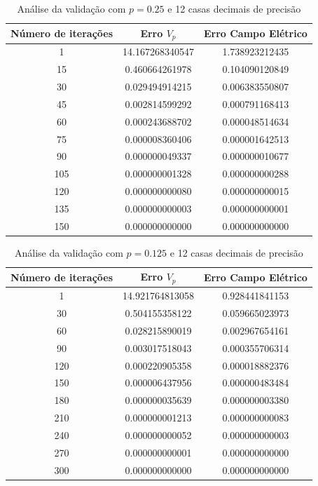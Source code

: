 \documentclass[oneside]{abntex2}
\begin{document}
\begin{table}[h]
    \centering
    \begin{tabular}{c|c|c}
    Número de iterações &Erro $V_p$ &Erro Campo Elétrico  \\
    \hline
    1 & 14.167268340547 & 1.738923212435 \\
    15 & 0.460664261978 & 0.104090120849 \\
    30 & 0.029494914215 & 0.006383550807 \\
    45 & 0.002814599292 & 0.000791168413 \\
    60 & 0.000243688702 & 0.000048514634 \\
    75 & 0.000008360406 & 0.000001642513 \\
    90 & 0.000000049337 & 0.000000010677 \\
    105 & 0.000000001328 & 0.000000000288 \\
    120 & 0.000000000080 & 0.000000000015 \\
    135 & 0.000000000003 & 0.000000000001 \\
    150 & 0.000000000000 & 0.000000000000 \\
    \end{tabular}
    \caption{Análise da validação com $p = 0.25$ e 12 casas decimais de precisão}
    \label{tab:iter_p025}
\end{table}

\begin{table}[h]
    \centering
    \begin{tabular}{c|c|c}
    Número de iterações &Erro $V_p$ &Erro Campo Elétrico  \\
    \hline
    1 & 14.921764813058 & 0.928441841153 \\
    30 & 0.504155358122 & 0.059665023973 \\
    60 & 0.028215890019 & 0.002967654161 \\
    90 & 0.003017518043 & 0.000355706314 \\
    120 & 0.000220905358 & 0.000018882376 \\
    150 & 0.000006437956 & 0.000000483484 \\
    180 & 0.000000035639 & 0.000000003380 \\
    210 & 0.000000001213 & 0.000000000083 \\
    240 & 0.000000000052 & 0.000000000003 \\
    270 & 0.000000000001 & 0.000000000000 \\
    300 & 0.000000000000 & 0.000000000000 \\
    \end{tabular}
    \caption{Análise da validação com $p = 0.125$ e 12 casas decimais de precisão}
    \label{tab:iter_p0125}
\end{table}
\end{document}
